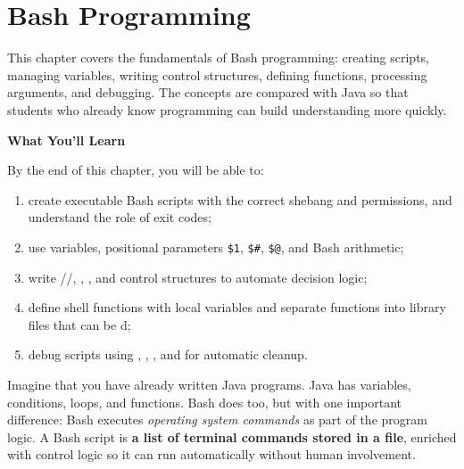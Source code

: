 
\chapter{Bash Programming}
\label{ch:bash-programming}


This chapter covers the fundamentals of Bash programming: creating scripts,
managing variables, writing control structures, defining functions,
processing arguments, and debugging. The concepts are compared with Java so
that students who already know programming can build understanding more
quickly.

\textbf{What You'll Learn}

By the end of this chapter, you will be able to:

\begin{enumerate}
    \item create executable Bash scripts with the correct shebang and permissions, and understand the role of exit codes;
    \item use variables, positional parameters \texttt{\$1}, \texttt{\$\#}, \texttt{\$@}, and Bash arithmetic;
    \item write //, , , and  control structures to automate decision logic;
    \item define shell functions with local variables and separate functions into library files that can be d;
    \item debug scripts using , , , and  for automatic cleanup.
\end{enumerate}

\begin{examplebox}
Imagine that you have already written Java programs. Java has variables,
conditions, loops, and functions. Bash does too, but with one important
difference: Bash executes \textit{operating system commands} as part of the
program logic. A Bash script is \textbf{a list of terminal commands stored in
a file}, enriched with control logic so it can run automatically without
human involvement.
\end{examplebox}

